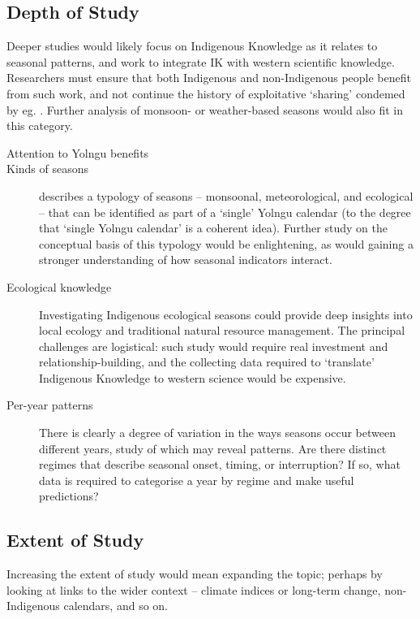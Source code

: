 \subsection{Depth of Study}
Deeper studies would likely focus on Indigenous Knowledge as it
relates to seasonal patterns, and work to integrate IK with western scientific
knowledge.  Researchers must ensure that both Indigenous and non-Indigenous
people benefit from such work, and not continue the history of exploitative
`sharing' condemed by eg. \citet{smith1999}.  Further analysis of monsoon-
or weather-based seasons would also fit in this category.

\begin{description}
\item[Attention to Yolngu benefits]

\item[Kinds of seasons]
     describes a typology of seasons -- monsoonal,
    meteorological, and ecological -- that can be identified as part of a
    `single' Yolngu calendar (to the degree that `single Yolngu calendar'
    is a coherent idea).  Further study on the conceptual basis of this typology would
    be enlightening, as would gaining a stronger understanding of how
    seasonal indicators interact.

\item[Ecological knowledge]
    Investigating Indigenous ecological seasons could provide deep insights
    into local ecology and traditional natural resource management. The
    principal challenges are logistical:  such study would require real
    investment and relationship-building, and the collecting data
    required to `translate' Indigenous Knowledge to western science would
    be expensive.

\item[Per-year patterns]
    There is clearly a degree of variation in the ways seasons occur between
    different years, study of which may reveal patterns.  Are there distinct
    regimes that describe seasonal onset, timing, or interruption?  If so, what
    data is required to categorise a year by regime and make useful predictions?
\end{description}

\subsection{Extent of Study}
Increasing the extent of study would mean expanding the topic; perhaps by
looking at links to the wider context -- climate indices or long-term
change, non-Indigenous calendars, and so on.


